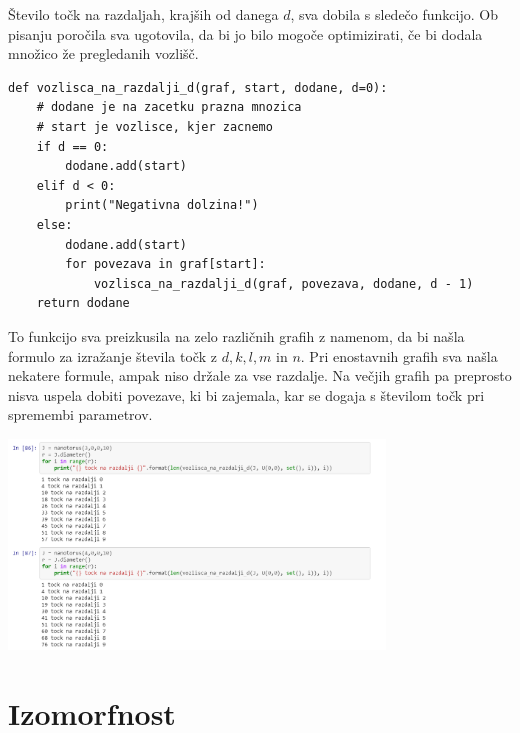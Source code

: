 \documentclass[a4paper, 10 pt, titlepage]{article}
\begin{document}
Število točk na razdaljah, krajših od danega $d$, sva dobila s sledečo funkcijo. Ob pisanju poročila sva ugotovila, da bi jo bilo mogoče optimizirati, če bi dodala množico že pregledanih vozlišč.

\begin{verbatim}
def vozlisca_na_razdalji_d(graf, start, dodane, d=0):
    # dodane je na zacetku prazna mnozica
    # start je vozlisce, kjer zacnemo
    if d == 0:
        dodane.add(start)
    elif d < 0:
        print("Negativna dolzina!")
    else:
        dodane.add(start)
        for povezava in graf[start]:
            vozlisca_na_razdalji_d(graf, povezava, dodane, d - 1)
    return dodane
\end{verbatim}

To funkcijo sva preizkusila na zelo različnih grafih z namenom, da bi našla formulo za izražanje števila točk z $d, k, l, m$ in $n$. Pri enostavnih grafih sva našla nekatere formule, ampak niso držale za vse razdalje. Na večjih grafih pa preprosto nisva uspela dobiti povezave, ki bi zajemala, kar se dogaja s številom točk pri spremembi parametrov. 

\begin{center}
\includegraphics[width=10cm]{tocke}
\end{center}

\pagebreak

\section{Izomorfnost}
\end{document}
